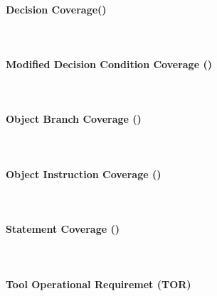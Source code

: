 \paragraph*{Decision Coverage(\dc)} \ \\

\paragraph*{Modified Decision Condition Coverage (\mcdc)} \ \\

\paragraph*{Object Branch Coverage (\obc)} \ \\

\paragraph*{Object Instruction Coverage (\oic)} \ \\

\paragraph*{Statement Coverage (\stc)} \ \\

\paragraph*{Tool Operational Requiremet (TOR)} \ \\


